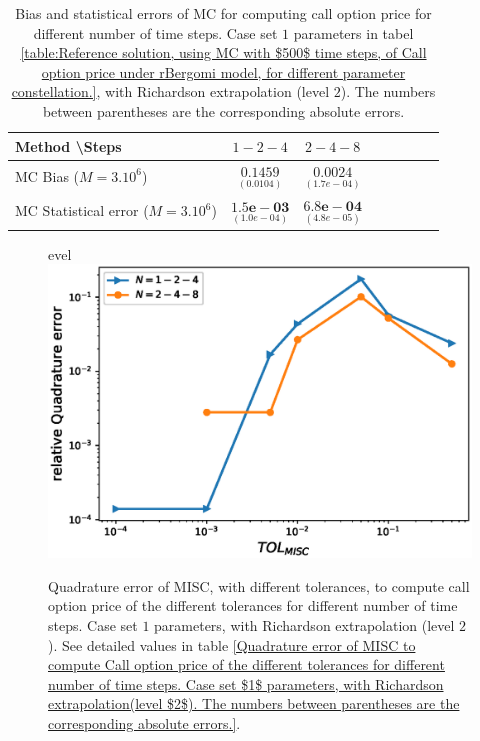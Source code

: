 \begin{table}[h!]
	\centering
	\begin{tabular}{l*{6}{c}r}
		Method \textbackslash  Steps            & $1-2-4$ & $2-4-8$  \\
		\hline
		MC  Bias ($M=3.10^6$)     &$\underset{( 0.0104)}{\mathbf{ 0.1459}}$  & $\underset{(    1.7e-04)}{\mathbf{0.0024}}$   \\	
		
		MC Statistical error ($M=3.10^6$)   & $\underset{( 1.0e-04)}{\mathbf{1.5e-03}}$  & $\underset{(   4.8e-05)}{\mathbf{    6.8e-04}}$  \\	
		
		
		
		\hline
	\end{tabular}
	\caption{Bias and statistical errors of MC   for computing call option price  for different number of time steps. Case set $1$ parameters in tabel \ref{table:Reference solution, using MC with $500$ time steps, of Call option price under rBergomi model, for different parameter constellation.}, with Richardson extrapolation (level $2$). The numbers between parentheses are the corresponding absolute errors.}
	\label{Bias and Statistical errors of MC ($M=3.10^6$)  for computing Call option price  for different number of time steps. Case set $1$ parameters, with Richardson extrapolation (level2). The numbers between parentheses are the corresponding absolute errors.}
\end{table}




\FloatBarrier
\begin{figure}[h!]
	\centering
	evel\includegraphics[width=0.4\linewidth]{./figures/rBergomi_MISC_quadratre_error/vs_TOL/set1/relative_quad_error_wrt_MISC_TOL_set1_rich_level2}
	
	
	\caption{Quadrature error of MISC, with different tolerances, to compute call option price of the different tolerances for different number of time steps. Case  set $1$ parameters, with Richardson extrapolation (level $2$).  See detailed values  in table \ref{Quadrature error of MISC to compute Call option price of the different tolerances for different number of time steps. Case set $1$ parameters, with Richardson extrapolation(level $2$). The numbers between parentheses are the corresponding absolute errors.}.}
	\label{fig:Quadrature_error_set1_rich_level2}
\end{figure}



